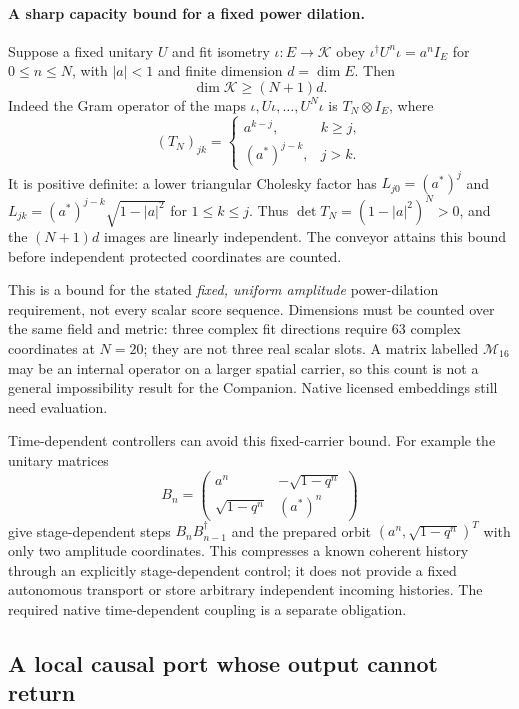 \documentclass[11pt,a4paper]{article}
\begin{document}
\paragraph{A sharp capacity bound for a fixed power dilation.}
Suppose a fixed unitary $U$ and fit isometry $\iota:E\to\mathcal K$
obey $\iota^\dagger U^n\iota=a^nI_E$ for $0\le n\le N$,
with $|a|<1$ and finite dimension $d=\dim E$. Then
\[
 \dim\mathcal K\ge(N+1)d.
\]
Indeed the Gram operator of the maps
$\iota,U\iota,\ldots,U^N\iota$ is $T_N\otimes I_E$, where
\[
 (T_N)_{jk}=
 \begin{cases}a^{k-j},&k\ge j,\\(a^*)^{j-k},&j>k.\end{cases}
\]
It is positive definite: a lower triangular Cholesky factor has
$L_{j0}=(a^*)^j$ and
$L_{jk}=(a^*)^{j-k}\sqrt{1-|a|^2}$ for $1\le k\le j$.
Thus $\det T_N=(1-|a|^2)^N>0$, and the $(N+1)d$ images are
linearly independent. The conveyor attains this bound before
independent protected coordinates are counted.

This is a bound for the stated \emph{fixed, uniform amplitude}
power-dilation requirement, not every scalar score sequence.
Dimensions must be counted over the same field and metric: three
complex fit directions require 63 complex coordinates at $N=20$;
they are not three real scalar slots. A matrix labelled
$\mathcal M_{16}$ may be an internal operator on a larger spatial
carrier, so this count is not a general impossibility result for
the Companion. Native licensed embeddings still need evaluation.

Time-dependent controllers can avoid this fixed-carrier bound.
For example the unitary matrices
\[
 B_n=\begin{pmatrix}a^n&-\sqrt{1-q^n}\\
                    \sqrt{1-q^n}&(a^*)^n\end{pmatrix}
\]
give stage-dependent steps $B_nB_{n-1}^\dagger$ and the prepared
orbit $(a^n,\sqrt{1-q^n})^T$ with only two amplitude coordinates.
This compresses a known coherent history through an explicitly
stage-dependent control; it does not provide a fixed autonomous
transport or store arbitrary independent incoming histories.
The required native time-dependent coupling is a separate obligation.

\subsection{A local causal port whose output cannot return}
\end{document}
